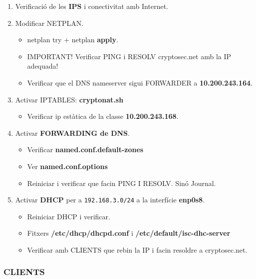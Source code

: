 \documentclass[]{article}
\providecommand{\tightlist}{%
  \setlength{\itemsep}{0pt}\setlength{\parskip}{0pt}}
\begin{document}
\begin{enumerate}
\def\labelenumi{\arabic{enumi}.}
\item
  Verificació de les \textbf{IPS} i conectivitat amb Internet.
\item
  Modificar NETPLAN.

  \begin{itemize}
  \item
    netplan try + netplan \textbf{apply}.
  \item
    IMPORTANT! Verificar PING i RESOLV cryptosec.net amb la IP adequada!
  \item
    Verificar que el DNS nameserver sigui FORWARDER a
    \textbf{10.200.243.164}.
  \end{itemize}
\item
  Activar IPTABLES: \textbf{cryptonat.sh}

  \begin{itemize}
  \tightlist
  \item
    Verificar ip estàtica de la classe \textbf{10.200.243.168}.
  \end{itemize}
\item
  Activar \textbf{FORWARDING de DNS}.

  \begin{itemize}
  \item
    Verificar \textbf{named.conf.default-zones}
  \item
    Ver \textbf{named.conf.options}
  \item
    Reiniciar i verificar que facin PING I RESOLV. Sinó Journal.
  \end{itemize}
\item
  Activar \textbf{DHCP} per a \texttt{192.168.3.0/24} a la interfície
  \textbf{enp0s8}.

  \begin{itemize}
  \item
    Reiniciar DHCP i verificar.
  \item
    Fitxers \textbf{/etc/dhcp/dhcpd.conf} i
    \textbf{/etc/default/isc-dhc-server}
  \item
    Verificar amb CLIENTS que rebin la IP i facin resoldre a
    cryptosec.net.
  \end{itemize}
\end{enumerate}

\hypertarget{clients}{%
\subsubsection{\texorpdfstring{\textbf{CLIENTS}}{CLIENTS}}\label{clients}}
\end{document}
